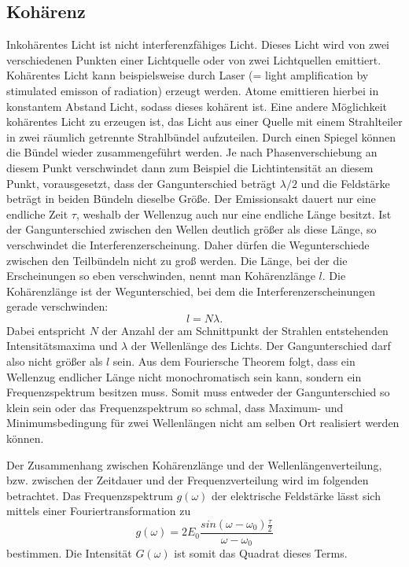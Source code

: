 \subsection{Kohärenz}
Inkohärentes Licht ist nicht interferenzfähiges Licht. Dieses Licht wird von zwei
verschiedenen Punkten einer Lichtquelle oder von zwei Lichtquellen emittiert.
\newline
Kohärentes Licht kann beispielsweise durch Laser (= light amplification by stimulated emisson of radiation)
erzeugt werden. Atome emittieren hierbei in konstantem Abstand Licht, sodass dieses 
kohärent ist.
\newline
Eine andere Möglichkeit kohärentes Licht zu erzeugen ist, das Licht aus einer Quelle
mit einem Strahlteiler in zwei räumlich getrennte Strahlbündel aufzuteilen.
Durch einen Spiegel können die Bündel wieder zusammengeführt werden.
%
Je nach Phasenverschiebung an diesem Punkt 
verschwindet dann zum Beispiel die Lichtintensität an diesem Punkt, vorausgesetzt, dass 
der Gangunterschied beträgt $\lambda/2$ und die Feldstärke beträgt in beiden Bündeln 
dieselbe Größe.
\newline
Der Emissionsakt dauert nur eine endliche Zeit $\tau$, weshalb der Wellenzug auch nur 
eine endliche Länge besitzt. Ist der Gangunterschied zwischen den Wellen deutlich größer 
als diese Länge, so verschwindet die Interferenzerscheinung. Daher dürfen die 
Wegunterschiede zwischen den Teilbündeln nicht zu groß werden. Die Länge, bei der die 
Erscheinungen so eben verschwinden, nennt man Kohärenzlänge $l$. 
%
Die Kohärenzlänge ist der Wegunterschied, bei dem die Interferenzerscheinungen
gerade verschwinden:
\begin{equation}
    l = N \lambda.
\end{equation}
Dabei entspricht $N$ der Anzahl der am Schnittpunkt der Strahlen entstehenden Intensitätsmaxima 
und $\lambda$ der Wellenlänge des Lichts. 
Der Gangunterschied darf also nicht größer als $l$ sein.
\newline
Aus dem Fouriersche Theorem folgt, dass ein Wellenzug endlicher Länge nicht 
monochromatisch sein kann, sondern ein Frequenzspektrum besitzen muss. Somit muss 
entweder der Gangunterschied so klein sein oder das Frequenzspektrum so schmal, dass 
Maximum- und Minimumsbedingung für zwei Wellenlängen nicht am selben Ort realisiert werden 
können. 

Der Zusammenhang zwischen Kohärenzlänge und der Wellenlängenverteilung, bzw. zwischen 
der Zeitdauer und der Frequenzverteilung wird im folgenden betrachtet. 
Das Frequenzspektrum $g(\omega)$ der elektrische Feldstärke lässt sich mittels einer 
Fouriertransformation zu 
\begin{equation}
    g(\omega) = 2 E_0 \frac{sin(\omega - \omega_0) \frac{\tau}{2}}{\omega- \omega_0}
\end{equation}
bestimmen. 
Die Intensität $G(\omega)$ ist somit das Quadrat dieses Terms. 

